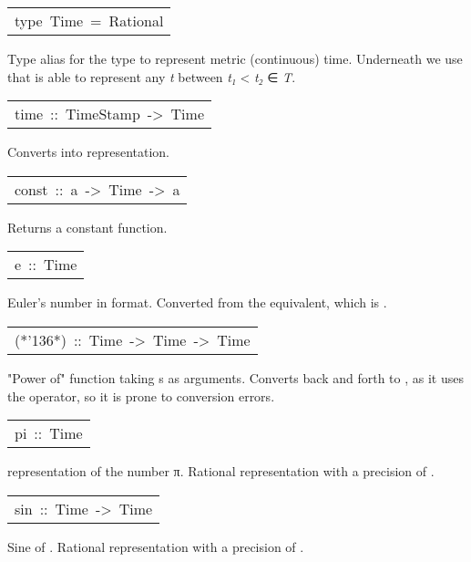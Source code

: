 \begin{haddockdesc}
\item[\begin{tabular}{@{}l}
type\ Time\ =\ Rational
\end{tabular}]\haddockbegindoc
Type alias for the type to represent metric (continuous)
 time. Underneath we use  that is able to represent any
 \emph{t} between \emph{t₁} < \emph{t₂} ∈ \emph{T}.\par


\item[\begin{tabular}{@{}l}
time\ ::\ TimeStamp\ ->\ Time
\end{tabular}]\haddockbegindoc
Converts  into  representation.\par


\item[\begin{tabular}{@{}l}
const\ ::\ a\ ->\ Time\ ->\ a
\end{tabular}]\haddockbegindoc
Returns a constant function.\par


\item[\begin{tabular}{@{}l}
e\ ::\ Time
\end{tabular}]\haddockbegindoc
Euler's number in  format. Converted from the 
 equivalent, which is .\par


\item[\begin{tabular}{@{}l}
(*{\char '136}*)\ ::\ Time\ ->\ Time\ ->\ Time
\end{tabular}]\haddockbegindoc
"Power of" function taking s as arguments. Converts back
 and forth to , as it uses the \haddockid{**} operator, so
 it is prone to conversion errors.\par


\item[\begin{tabular}{@{}l}
pi\ ::\ Time
\end{tabular}]\haddockbegindoc
{} representation of the number π. Rational
 representation with a precision of .\par


\item[\begin{tabular}{@{}l}
sin\ ::\ Time\ ->\ Time
\end{tabular}]\haddockbegindoc
Sine of . Rational representation with a precision of
 .\par



\end{haddockdesc}
